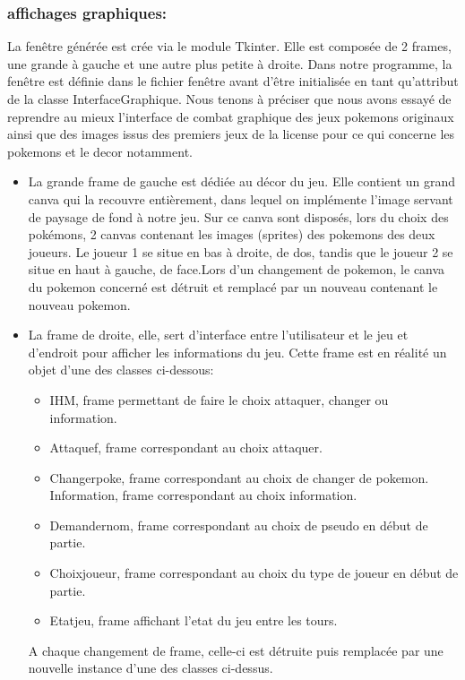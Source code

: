         \subsubsection{affichages graphiques:}
            La fenêtre générée est crée via le module Tkinter. Elle est composée de 2 frames, une grande à gauche et une autre plus petite à droite. Dans notre programme, la fenêtre est définie dans le fichier fenêtre avant d'être initialisée en tant qu'attribut de la classe InterfaceGraphique. Nous tenons à préciser que nous avons essayé de reprendre au mieux l'interface de combat graphique des jeux pokemons originaux ainsi que des images issus des premiers jeux de la license pour ce qui concerne les pokemons et le decor notamment.
            \begin{itemize}
                \item La grande frame de gauche est dédiée au décor du jeu. Elle contient un grand canva qui la recouvre entièrement, dans lequel on implémente l'image servant de paysage de fond à notre jeu. Sur ce canva sont disposés, lors du choix des pokémons, 2 canvas contenant les images (sprites) des pokemons des deux joueurs. Le joueur 1 se situe en bas à droite, de dos, tandis que le joueur 2 se situe en haut à gauche, de face.Lors d'un changement de pokemon, le canva du pokemon concerné est détruit et remplacé par un nouveau contenant le nouveau pokemon.

                \item La frame de droite, elle, sert d'interface entre l'utilisateur et le jeu et d'endroit pour afficher les informations du jeu. Cette frame est en réalité un objet d'une des classes ci-dessous:
                \begin{itemize}
                    \item IHM, frame permettant de faire le choix attaquer, changer ou information.
                    \item Attaquef, frame correspondant au choix attaquer.
                    \item Changerpoke, frame correspondant au choix de changer de pokemon.
                    Information, frame correspondant au choix information.
                    \item Demandernom, frame correspondant au choix de pseudo en début de partie.
                    \item Choixjoueur, frame correspondant au choix du type de joueur en début de partie.
                    \item Etatjeu, frame affichant l'etat du jeu entre les tours.
                \end{itemize}
                A chaque changement de frame, celle-ci est détruite puis remplacée par une nouvelle instance d'une des classes ci-dessus.
            \end{itemize}
            
